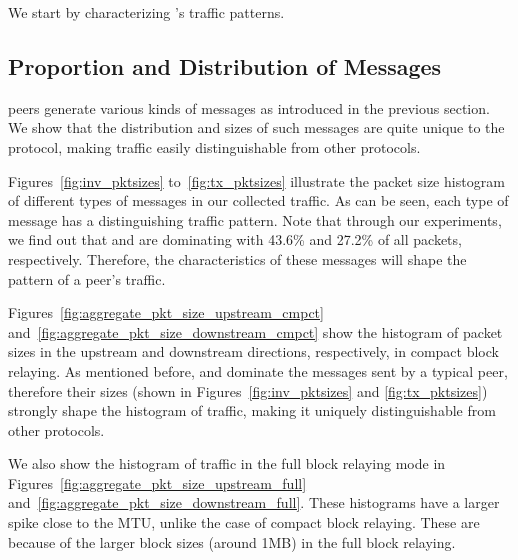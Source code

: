 We start by characterizing \bc's traffic patterns. 

\subsection{Proportion and Distribution of Messages} \label{sec:prop_dist_msg}
\bc peers generate various kinds of messages as introduced in the previous section. 
We show that the distribution and sizes of such messages are quite unique to the \bc protocol, 
making \bc traffic easily distinguishable from other protocols. 

Figures~\ref{fig:inv_pktsizes} to~\ref{fig:tx_pktsizes} illustrate
the  packet size histogram of 
different types of \bc messages in our collected \bc traffic.
As can be seen, each type of message has a distinguishing traffic pattern. Note that through our experiments, we find out that  and  are dominating with 43.6\% and 27.2\% of all packets, respectively. 
Therefore, the characteristics of these messages will shape the pattern of a \bc peer's traffic. 


Figures~\ref{fig:aggregate_pkt_size_upstream_cmpct} and~\ref{fig:aggregate_pkt_size_downstream_cmpct} show the histogram of packet sizes in the upstream and downstream directions, respectively, in compact block relaying. 
As mentioned before,  and  dominate the messages sent by a typical \bc peer, therefore their sizes 
(shown in Figures~\ref{fig:inv_pktsizes} and \ref{fig:tx_pktsizes}) strongly shape the histogram of \bc traffic, making it uniquely distinguishable from other protocols. 

We also show the histogram of \bc traffic in the full block relaying mode in Figures~\ref{fig:aggregate_pkt_size_upstream_full} and~\ref{fig:aggregate_pkt_size_downstream_full}. These histograms have a larger spike close to the MTU, unlike the case of compact block relaying. These are because of the larger block sizes (around 1MB) in the full block relaying. 

